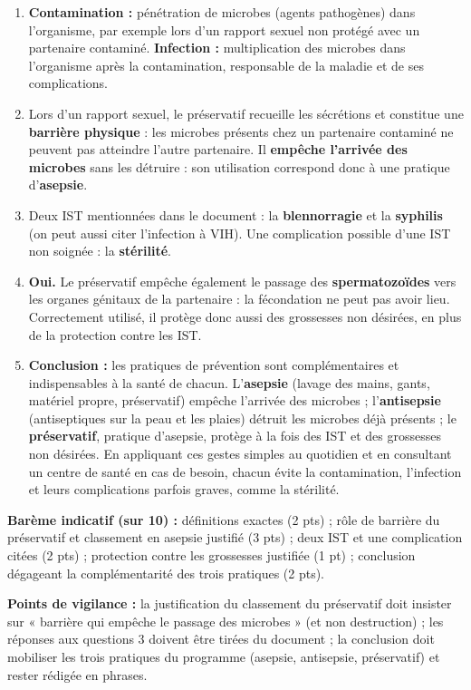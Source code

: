 \documentclass[11pt]{article}
\begin{document}
\begin{corrige}
\begin{enumerate}
\item \textbf{Contamination :} pénétration de microbes (agents pathogènes) dans l'organisme, par exemple lors d'un rapport sexuel non protégé avec un partenaire contaminé. \textbf{Infection :} multiplication des microbes dans l'organisme après la contamination, responsable de la maladie et de ses complications.
\item Lors d'un rapport sexuel, le préservatif recueille les sécrétions et constitue une \textbf{barrière physique} : les microbes présents chez un partenaire contaminé ne peuvent pas atteindre l'autre partenaire. Il \textbf{empêche l'arrivée des microbes} sans les détruire : son utilisation correspond donc à une pratique d'\textbf{asepsie}.
\item Deux IST mentionnées dans le document : la \textbf{blennorragie} et la \textbf{syphilis} (on peut aussi citer l'infection à VIH). Une complication possible d'une IST non soignée : la \textbf{stérilité}.
\item \textbf{Oui.} Le préservatif empêche également le passage des \textbf{spermatozoïdes} vers les organes génitaux de la partenaire : la fécondation ne peut pas avoir lieu. Correctement utilisé, il protège donc aussi des grossesses non désirées, en plus de la protection contre les IST.
\item \textbf{Conclusion :} les pratiques de prévention sont complémentaires et indispensables à la santé de chacun. L'\textbf{asepsie} (lavage des mains, gants, matériel propre, préservatif) empêche l'arrivée des microbes ; l'\textbf{antisepsie} (antiseptiques sur la peau et les plaies) détruit les microbes déjà présents ; le \textbf{préservatif}, pratique d'asepsie, protège à la fois des IST et des grossesses non désirées. En appliquant ces gestes simples au quotidien et en consultant un centre de santé en cas de besoin, chacun évite la contamination, l'infection et leurs complications parfois graves, comme la stérilité.
\end{enumerate}
\textbf{Barème indicatif (sur 10) :} définitions exactes (2 pts) ; rôle de barrière du préservatif et classement en asepsie justifié (3 pts) ; deux IST et une complication citées (2 pts) ; protection contre les grossesses justifiée (1 pt) ; conclusion dégageant la complémentarité des trois pratiques (2 pts).

\textbf{Points de vigilance :} la justification du classement du préservatif doit insister sur « barrière qui empêche le passage des microbes » (et non destruction) ; les réponses aux questions 3 doivent être tirées du document ; la conclusion doit mobiliser les trois pratiques du programme (asepsie, antisepsie, préservatif) et rester rédigée en phrases.
\end{corrige}
\end{document}
